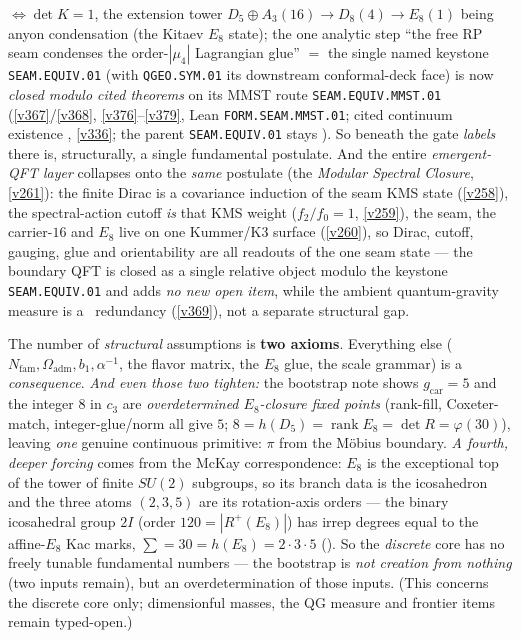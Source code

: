 \documentclass[11pt,a4paper]{article}
\newcommand{\cthree}{c_3}
\newcommand{\gcar}{g_{\mathrm{car}}}
\newcommand{\Nfam}{N_{\mathrm{fam}}}
\newcommand{\Oadm}{\Omega_{\mathrm{adm}}}
\newcommand{\ainv}{\alpha^{-1}}
\begin{document}
$\Leftrightarrow\det K=1$, the extension tower $D_5{\oplus}A_3(16)\to D_8(4)\to E_8(1)$ being anyon
condensation (the Kitaev $E_8$ state); the one analytic step ``the free RP seam condenses the
order-$|\mu_4|$ Lagrangian glue'' $=$ the single named keystone \texttt{SEAM.EQUIV.01} (with
\texttt{QGEO.SYM.01} its downstream conformal-deck face) is now \emph{closed modulo cited theorems} on its MMST
route \texttt{SEAM.EQUIV.MMST.01}
(\vref{v367}/\vref{v368}, \vref{v376}--\vref{v379}, Lean \texttt{FORM.SEAM.MMST.01}; cited continuum existence \mO,
\vref{v336}; the parent \texttt{SEAM.EQUIV.01} stays \mO). So beneath the gate \emph{labels} there is,
structurally, a single fundamental postulate. And the entire \emph{emergent-QFT layer} collapses onto the
\emph{same} postulate (the \emph{Modular Spectral Closure}, \vref{v261}): the finite Dirac is a
covariance induction of the seam KMS state (\vref{v258}), the spectral-action cutoff \emph{is} that KMS
weight ($f_2/f_0=1$, \vref{v259}), the seam, the carrier-$16$ and $E_8$ live on one Kummer/K3 surface
(\vref{v260}), so Dirac, cutoff, gauging, glue and orientability are all readouts of the one seam state ---
the boundary QFT is closed as a single relative object modulo the keystone \texttt{SEAM.EQUIV.01} and adds
\emph{no new open item}, while the ambient quantum-gravity measure is a \mC\ redundancy (\vref{v369}), not a separate
structural gap.
 

\begin{winboxnb}
The number of \emph{structural} assumptions is \textbf{two axioms}. Everything else
($\Nfam,\Oadm,b_1,\ainv$, the flavor matrix, the $E_8$ glue, the scale grammar) is a
\emph{consequence}. \emph{And even those two tighten:} the
bootstrap note shows $\gcar=5$ and the integer $8$ in $\cthree$ are \emph{overdetermined $E_8$-closure
fixed points} (rank-fill, Coxeter-match, integer-glue/norm all give $5$; $8=h(D_5)=\operatorname{rank}E_8=\det R=\varphi(30)$),
leaving \emph{one} genuine continuous primitive: $\pi$ from the Möbius boundary. \emph{A fourth, deeper
forcing} comes from the McKay correspondence: $E_8$ is the exceptional top of the tower of finite $SU(2)$
subgroups, so its branch data is the icosahedron and the three atoms $(2,3,5)$ are its rotation-axis orders
--- the binary icosahedral group $2I$ (order $120=|R^+(E_8)|$) has irrep degrees equal to the affine-$E_8$
Kac marks, $\sum=30=h(E_8)=2{\cdot}3{\cdot}5$ (). So the \emph{discrete}
core has no freely tunable fundamental numbers --- the bootstrap is \emph{not creation from nothing} (two
inputs remain), but an overdetermination of those inputs. (This concerns the discrete core only;
dimensionful masses, the QG measure and frontier items remain typed-open.)
   
\end{winboxnb}
\end{document}
